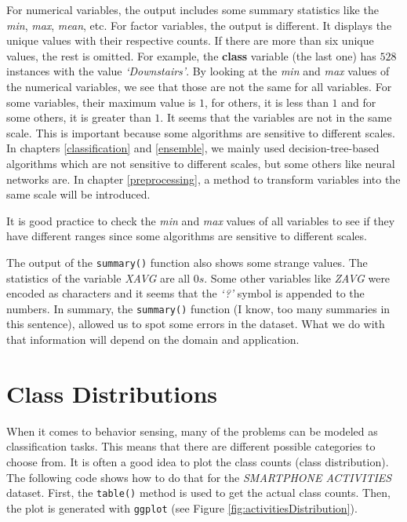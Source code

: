 \documentclass[
  11pt,
]{krantz}
\makeatletter
\newenvironment{kframe}{%
\medskip{}
\setlength{\fboxsep}{.8em}
 \def\at@end@of@kframe{}%
 \ifinner\ifhmode%
  \def\at@end@of@kframe{\end{minipage}}%
  \begin{minipage}{\columnwidth}%
 \fi\fi%
 \def\FrameCommand##1{\hskip\@totalleftmargin \hskip-\fboxsep
 \colorbox{shadecolor}{##1}\hskip-\fboxsep
     \hskip-\linewidth \hskip-\@totalleftmargin \hskip\columnwidth}%
 \MakeFramed {\advance\hsize-\width
   \@totalleftmargin\z@ \linewidth\hsize
   \@setminipage}}%
 {\par\unskip\endMakeFramed%
 \at@end@of@kframe}
\newenvironment{rmdblock}[1]
  {
  \begin{itemize}
  \renewcommand{\labelitemi}{
    \raisebox{-.7\height}[0pt][0pt]{
      {\setkeys{Gin}{width=3em,keepaspectratio}\texttt{[image: images/icons/\#1]}}
    }
  }
  \setlength{\fboxsep}{1em}
  \begin{kframe}
  \item
  }
  {
  \end{kframe}
  \end{itemize}
  }
\newenvironment{rmdgoodpractice}
  {\begin{rmdblock}{goodpractice}}
  {\end{rmdblock}}
\makeatother
\begin{document}
For numerical variables, the output includes some summary statistics like the \emph{min}, \emph{max}, \emph{mean}, etc. For factor variables, the output is different. It displays the unique values with their respective counts. If there are more than six unique values, the rest is omitted. For example, the \textbf{class} variable (the last one) has \(528\) instances with the value \emph{`Downstairs'}. By looking at the \emph{min} and \emph{max} values of the numerical variables, we see that those are not the same for all variables. For some variables, their maximum value is \(1\), for others, it is less than \(1\) and for some others, it is greater than \(1\). It seems that the variables are not in the same scale. This is important because some algorithms are sensitive to different scales. In chapters \ref{classification} and \ref{ensemble}, we mainly used decision-tree-based algorithms which are not sensitive to different scales, but some others like neural networks are. In chapter \ref{preprocessing}, a method to transform variables into the same scale will be introduced.

\begin{rmdgoodpractice}
It is good practice to check the \emph{min} and \emph{max} values of all variables to see if they have different ranges since some algorithms are sensitive to different scales.
\end{rmdgoodpractice}
The output of the \texttt{summary()} function also shows some strange values. The statistics of the variable \emph{XAVG} are all \(0s\). Some other variables like \emph{ZAVG} were encoded as characters and it seems that the \emph{`?'} symbol is appended to the numbers. In summary, the \texttt{summary()} function (I know, too many summaries in this sentence), allowed us to spot some errors in the dataset. What we do with that information will depend on the domain and application.

\hypertarget{class-distributions}{%
\section{Class Distributions}\label{class-distributions}}

When it comes to behavior sensing, many of the problems can be modeled as classification tasks. This means that there are different possible categories to choose from. It is often a good idea to plot the class counts (class distribution). The following code shows how to do that for the \emph{SMARTPHONE ACTIVITIES} dataset. First, the \texttt{table()} method is used to get the actual class counts. Then, the plot is generated with \texttt{ggplot} (see Figure \ref{fig:activitiesDistribution}).
\end{document}
